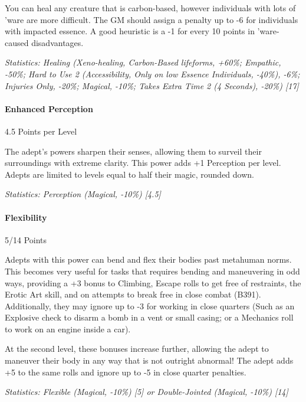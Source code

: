 \begin{multicols}{3}
	You can heal any creature that is carbon-based, however individuals with lots of 'ware are more difficult. The GM should assign a penalty up to -6 for individuals with impacted essence. A good heuristic is a -1 for every 10 points in 'ware-caused disadvantages.

	\textcolor{OliveGreen}{\textit{Statistics: Healing (Xeno-healing, Carbon-Based lifeforms, +60\%; Empathic, -50\%; Hard to Use 2 (Accessibility, Only on low Essence Individuals, -40\%), -6\%; Injuries Only, -20\%; Magical, -10\%; Takes Extra Time 2 (4 Seconds), -20\%) [17] }}
	
	\paragraph{Enhanced Perception}
	\begin{flushright}
		4.5 Points per Level
	\end{flushright}

	The adept's powers sharpen their senses, allowing them to surveil their surroundings with extreme clarity. This power adds +1 Perception per level. Adepts are limited to levels equal to half their magic, rounded down.

	\textcolor{OliveGreen}{\textit{Statistics: Perception (Magical, -10\%) [4.5] }}
	
	\paragraph{Flexibility}
	\begin{flushright}
		5/14 Points
	\end{flushright}

	Adepts with this power can bend and flex their bodies past metahuman norms. This becomes very useful for tasks that requires bending and maneuvering in odd ways, providing a +3 bonus to Climbing, Escape rolls to get free of restraints, the Erotic Art skill, and on attempts to break free in close combat (B391). Additionally, they may ignore up to -3 for working in close quarters (Such as an Explosive check to disarm a bomb in a vent or small casing; or a Mechanics roll to work on an engine inside a car).
	
	At the second level, these bonuses increase further, allowing the adept to maneuver their body in any way that is not outright abnormal! The adept adds +5 to the same rolls and ignore up to -5 in close quarter penalties.

	\textcolor{OliveGreen}{\textit{Statistics: Flexible (Magical, -10\%) [5] or Double-Jointed (Magical, -10\%) [14] }}


\end{multicols}
